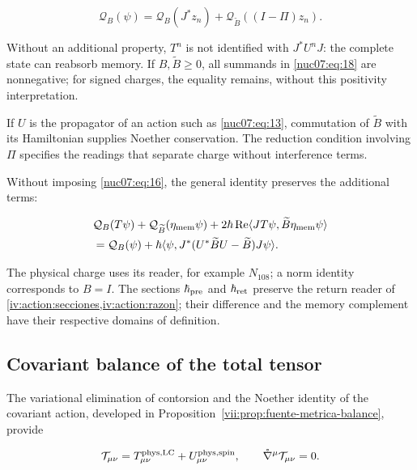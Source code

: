 \begin{equation}
\mathcal Q_B(\psi)=
\mathcal Q_B(J^*z_n)+
\mathcal Q_{\widetilde B}((I-\Pi)z_n).
\label{nuc07:eq:19}
\end{equation}

Without an additional property, \(T^n\) is not identified with \(J^*U^nJ\): the complete state can reabsorb memory. If \(B,\widetilde B\ge0\), all summands in \eqref{nuc07:eq:18} are nonnegative; for signed charges, the equality remains, without this positivity interpretation.

If \(U\) is the propagator of an action such as \eqref{nuc07:eq:13}, commutation of \(\widetilde B\) with its Hamiltonian supplies Noether conservation. The reduction condition involving \(\Pi\) specifies the readings that separate charge without interference terms.

Without imposing \eqref{nuc07:eq:16}, the general identity preserves the additional terms:

\begin{equation}
\begin{aligned}
&\mathcal Q_B(T\psi)+\mathcal Q_{\widetilde B}(\eta_{\rm mem}\psi)
+2\hbar\operatorname{Re}
\langle JT\psi,\widetilde B\eta_{\rm mem}\psi\rangle\\
&=\mathcal Q_B(\psi)+
\hbar\langle\psi,J^*(U^*\widetilde BU-\widetilde B)J\psi\rangle.
\end{aligned}
\label{nuc07:eq:20}
\end{equation}

The physical charge uses its reader, for example \(N_{108}\); a norm identity corresponds to \(B=I\). The sections \(\hbar_{\rm pre}\) and \(\hbar_{\rm ret}\) preserve the return reader of \cref{iv:action:secciones,iv:action:razon}; their difference and the memory complement have their respective domains of definition.

\pagebreak %
\subsection{Covariant balance of the total tensor}

The variational elimination of contorsion and the Noether identity of the covariant action, developed in Proposition~\ref{vii:prop:fuente-metrica-balance}, provide

\begin{equation}
\mathcal T_{\mu\nu}
=T^{\rm phys,LC}_{\mu\nu}+U^{\rm phys,spin}_{\mu\nu},
\qquad
\mathring\nabla^\mu\mathcal T_{\mu\nu}=0.
\label{nuc07:eq:21}
\end{equation}


